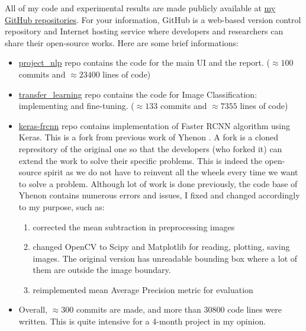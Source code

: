 All of my code and experimental results are made publicly available at  \href{https://github.com/vuhonganh?tab=repositories}{my GitHub repositories}. For your information, GitHub is a web-based version control repository and Internet hosting service where developers and researchers can share their open-source works. Here are some brief informations:
\begin{itemize}
	\item \href{https://github.com/vuhonganh/project_nlp}{project\_nlp} repo contains the code for the main UI and the report. ($\approx 100$ commits and $\approx 23400$ lines of code)
	\item \href{https://github.com/vuhonganh/transfer_learning}{transfer\_learning} repo contains the code for Image Classification: implementing and fine-tuning. ($\approx 133$ commits and $\approx 7355$ lines of code)
	\item \href{https://github.com/vuhonganh/keras-frcnn}{keras-frcnn} repo contains implementation of Faster RCNN algorithm using Keras. This is a fork from previous work of Yhenon \cite{kerasFrcnn}. A fork is a cloned represitory of the original one so that the developers (who forked it) can extend the work to solve their specific problems. This is indeed the open-source spirit as we do not have to reinvent all the wheels every time we want to solve a problem. Although lot of work is done previously, the code base of Yhenon contains numerous errors and issues, I fixed and changed accordingly to my purpose, such as:
	\begin{enumerate}
		\item corrected the mean subtraction in preprocessing images
		\item changed OpenCV to Scipy and Matplotlib for reading, plotting, saving images. The original version has unreadable bounding box where a lot of them are outside the image boundary.
		\item reimplemented mean Average Precision metric for evaluation
	\end{enumerate}
	\item Overall, $\approx 300$ commits are made, and more than $30800$ code lines were written. This is quite intensive for a 4-month project in my opinion.
\end{itemize}